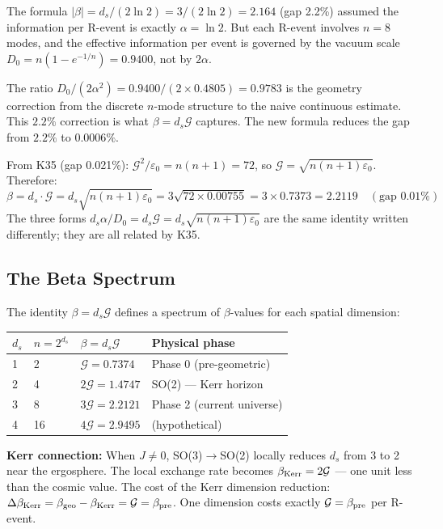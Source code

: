 \documentclass[12pt, a4paper]{article}
\begin{document}
The formula $|\beta| = d_s/(2\ln 2) = 3/(2\ln 2) = 2.164$ (gap 2.2\%) assumed the
information per R-event is exactly $\alpha = \ln 2$. But each R-event involves
$n = 8$ modes, and the effective information per event is governed by the vacuum scale
$D_0 = n(1-e^{-1/n}) = 0.9400$, not by $2\alpha$.

The ratio $D_0/(2\alpha^2) = 0.9400/(2\times 0.4805) = 0.9783$ is the geometry
correction from the discrete $n$-mode structure to the naive continuous estimate.
This $2.2\%$ correction is what $\beta = d_s\mathcal{G}$ captures. The new formula
reduces the gap from $2.2\%$ to $0.0006\%$.

\begin{derivedbox}[title={Connection to K35: $\beta = d_s\sqrt{n(n+1)}\,\varepsilon_0$}]
From K35 (gap 0.021\%): $\mathcal{G}^2/\varepsilon_0 = n(n+1) = 72$, so
$\mathcal{G} = \sqrt{n(n+1)\varepsilon_0}$. Therefore:
\[
  \beta = d_s \cdot \mathcal{G} = d_s\sqrt{n(n+1)\varepsilon_0}
  = 3\sqrt{72 \times 0.00755} = 3 \times 0.7373 = 2.2119 \quad (\text{gap }0.01\%)
\]
The three forms $d_s\alpha/D_0 = d_s\mathcal{G} = d_s\sqrt{n(n+1)\varepsilon_0}$ are
the same identity written differently; they are all related by K35.
\end{derivedbox}

\subsection{The Beta Spectrum}

The identity $\beta = d_s\mathcal{G}$ defines a spectrum of $\beta$-values for each
spatial dimension:

\begin{center}
\renewcommand{\arraystretch}{1.3}
\begin{tabular}{p{0.6cm} p{1.4cm} p{3.2cm} p{6cm}}
\toprule
$d_s$ & $n=2^{d_s}$ & $\beta = d_s\mathcal{G}$ & \textbf{Physical phase} \\
\midrule
1 & 2 & $\mathcal{G} = 0.7374$ & Phase 0 (pre-geometric) \\
2 & 4 & $2\mathcal{G} = 1.4747$ & SO(2) --- Kerr horizon \\
3 & 8 & $3\mathcal{G} = 2.2121$ & Phase 2 (current universe) \\
4 & 16 & $4\mathcal{G} = 2.9495$ & (hypothetical) \\
\bottomrule
\end{tabular}
\end{center}

\textbf{Kerr connection:} When $J\neq 0$, SO(3)$\to$SO(2) locally reduces $d_s$
from 3 to 2 near the ergosphere. The local exchange rate becomes
$\beta_{\rm Kerr} = 2\mathcal{G}$ --- one unit less than the cosmic value.
The cost of the Kerr dimension reduction:
$\Delta\beta_{\rm Kerr} = \beta_{\rm geo} - \beta_{\rm Kerr} = \mathcal{G} = \beta_{\rm pre}$.
One dimension costs exactly $\mathcal{G} = \beta_{\rm pre}$ per R-event.
\end{document}
